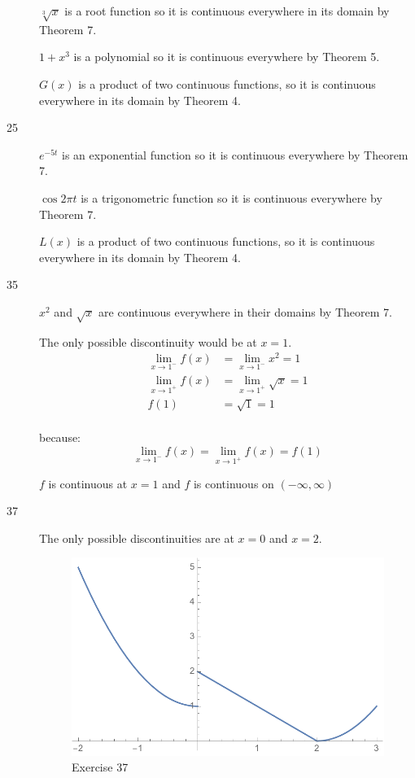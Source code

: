 \documentclass[letterpaper]{exam}
\begin{document}
\begin{description}
        $\sqrt[3]{x}$ is a root function so it is continuous everywhere in its
        domain by Theorem 7.

        $1 + x^3$ is a polynomial so it is continuous everywhere by Theorem 5.

        $G(x)$ is a product of two continuous functions, so it is continuous
        everywhere in its domain by Theorem 4.

      \item[25] 
        
        $e^{-5t}$ is an exponential function so it is continuous everywhere 
        by Theorem 7.

        $\cos 2 \pi t$ is a trigonometric function so it is continuous
        everywhere by Theorem 7.

        $L(x)$ is a product of two continuous functions, so it is continuous
        everywhere in its domain by Theorem 4.

      \item[35] $x^2$ and $\sqrt{x}$ are continuous everywhere in their domains
        by Theorem 7.

        The only possible discontinuity would be at $x = 1$.
        \begin{align*}
          \lim_{x \to 1^-} f(x) & = \lim_{x \to 1^-} x^2 = 1 \\
          \lim_{x \to 1^+} f(x) & = \lim_{x \to 1^+} \sqrt{x} = 1 \\
          f(1)                  & = \sqrt{1} = 1 \\
        \end{align*}

        because:
        \[
          \lim_{x \to 1^-} f(x) = \lim_{x \to 1^+} f(x) = f(1) 
        \]

        $f$ is continuous at $x = 1$ and $f$ is continuous on $(-\infty, \infty)$

      \item[37] The only possible discontinuities are at $x = 0$ and $x = 2$.

        \begin{figure}[H]
          \centering
          \includegraphics[scale = 0.5]{ex37.pdf}
          \caption{Exercise 37}
          \label{fig:ex37}
        \end{figure}


\end{description}
\end{document}
